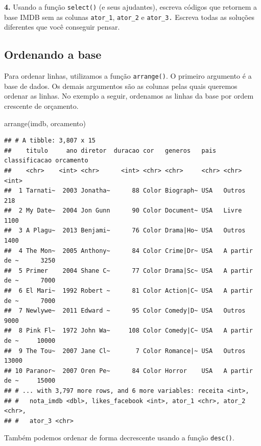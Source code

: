 \documentclass[
]{book}
\newenvironment{Shaded}{\begin{snugshade}}{\end{snugshade}}
\newcommand{\FunctionTok}[1]{\textcolor[rgb]{0.00,0.00,0.00}{#1}}
\newcommand{\NormalTok}[1]{#1}
\begin{document}
\textbf{4.} Usando a função \texttt{select()} (e seus ajudantes), escreva códigos que retornem a base IMDB sem as colunas \texttt{ator\_1}, \texttt{ator\_2} e \texttt{ator\_3.} Escreva todas as soluções diferentes que você conseguir pensar.

\hypertarget{ordenando-a-base}{%
\subsection{Ordenando a base}\label{ordenando-a-base}}

Para ordenar linhas, utilizamos a função \texttt{arrange()}. O primeiro argumento é a base de dados. Os demais argumentos são as colunas pelas quais queremos ordenar as linhas. No exemplo a seguir, ordenamos as linhas da base por ordem crescente de orçamento.

\begin{Shaded}
\begin{Highlighting}[]
\FunctionTok{arrange}\NormalTok{(imdb, orcamento)}
\end{Highlighting}
\end{Shaded}

\begin{verbatim}
## # A tibble: 3,807 x 15
##    titulo     ano diretor  duracao cor   generos   pais  classificacao orcamento
##    <chr>    <int> <chr>      <int> <chr> <chr>     <chr> <chr>             <int>
##  1 Tarnati~  2003 Jonatha~      88 Color Biograph~ USA   Outros              218
##  2 My Date~  2004 Jon Gunn      90 Color Document~ USA   Livre              1100
##  3 A Plagu~  2013 Benjami~      76 Color Drama|Ho~ USA   Outros             1400
##  4 The Mon~  2005 Anthony~      84 Color Crime|Dr~ USA   A partir de ~      3250
##  5 Primer    2004 Shane C~      77 Color Drama|Sc~ USA   A partir de ~      7000
##  6 El Mari~  1992 Robert ~      81 Color Action|C~ USA   A partir de ~      7000
##  7 Newlywe~  2011 Edward ~      95 Color Comedy|D~ USA   Outros             9000
##  8 Pink Fl~  1972 John Wa~     108 Color Comedy|C~ USA   A partir de ~     10000
##  9 The Tou~  2007 Jane Cl~       7 Color Romance|~ USA   Outros            13000
## 10 Paranor~  2007 Oren Pe~      84 Color Horror    USA   A partir de ~     15000
## # ... with 3,797 more rows, and 6 more variables: receita <int>,
## #   nota_imdb <dbl>, likes_facebook <int>, ator_1 <chr>, ator_2 <chr>,
## #   ator_3 <chr>
\end{verbatim}

Também podemos ordenar de forma decrescente usando a função \texttt{desc()}.
\end{document}
